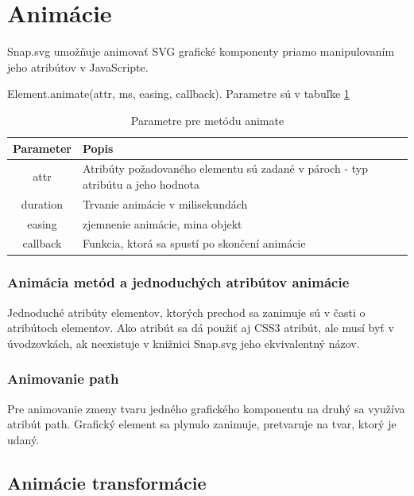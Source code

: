 \section{Animácie}

Snap.svg umožňuje animovať SVG grafické komponenty priamo manipulovaním jeho atribútov v JavaScripte. 

Element.animate(attr, ms, easing, callback). 
Parametre sú v tabuľke \ref{fig:animacie}
\begin{table}[H]
	\begin{center}
		\begin{tabular}{|c|p{10cm}|}
			\hline \textbf{Parameter} & \textbf{Popis} \\ 
			\hline attr &   Atribúty požadovaného elementu sú zadané v pároch - typ atribútu a jeho hodnota \\ 
			\hline duration &   Trvanie animácie v milisekundách \\ 
			\hline easing & zjemnenie animácie, mina objekt \\ 
			\hline callback & Funkcia, ktorá sa spustí po skončení animácie  \\ 
			\hline 
		\end{tabular} 
	\end{center}

	\caption{Parametre pre metódu animate}
		\label{fig:animacie}
\end{table}

\subsubsection{Animácia metód a jednoduchých atribútov animácie }

Jednoduché atribúty elementov, ktorých prechod sa zanimuje sú v časti o atribútoch elementov. Ako atribút sa dá použiť aj CSS3 atribút, ale musí byť v úvodzovkách, ak neexistuje v knižnici Snap.svg jeho ekvivalentný názov. 

\subsubsection{Animovanie path}

Pre animovanie zmeny tvaru jedného grafického komponentu na druhý sa využíva atribút path. Grafický element sa plynulo zanimuje, pretvaruje na tvar, ktorý je udaný. 

\subsection{Animácie transformácie}

